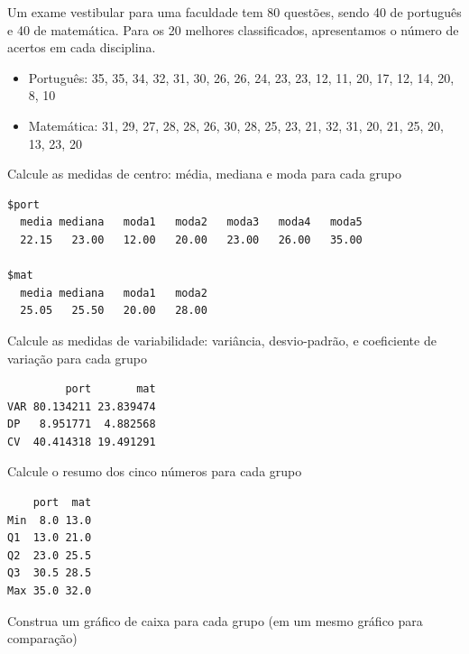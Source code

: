 \documentclass[a4paper,11pt,fleqn]{article}\usepackage[]{graphicx}\usepackage[]{color}
\makeatletter
\newenvironment{kframe}{%
 \def\at@end@of@kframe{}%
 \ifinner\ifhmode%
  \def\at@end@of@kframe{\end{minipage}}%
  \begin{minipage}{\columnwidth}%
 \fi\fi%
 \def\FrameCommand##1{\hskip\@totalleftmargin \hskip-\fboxsep
 \colorbox{shadecolor}{##1}\hskip-\fboxsep
     \hskip-\linewidth \hskip-\@totalleftmargin \hskip\columnwidth}%
 \MakeFramed {\advance\hsize-\width
   \@totalleftmargin\z@ \linewidth\hsize
   \@setminipage}}%
 {\par\unskip\endMakeFramed%
 \at@end@of@kframe}
\newenvironment{knitrout}{}{} %
\theoremstyle{definition}
\makeatother
\begin{document}
\begin{compactenum}[5.] %
\item Um exame vestibular para uma faculdade tem 80 questões, sendo 40
  de português e 40 de matemática. Para os 20 melhores classificados,
  apresentamos o número de acertos em cada disciplina.
  \begin{itemize}
  \item Português: 35, 35, 34, 32, 31, 30, 26, 26, 24, 23, 23, 12, 11,
    20, 17, 12, 14, 20, 8, 10
  \item Matemática: 31, 29, 27, 28, 28, 26, 30, 28, 25, 23, 21, 32, 31,
    20, 21, 25, 20, 13, 23, 20
  \end{itemize}

\begin{compactenum}
\item Calcule as medidas de centro: média, mediana e moda para cada grupo
\begin{knitrout}\small
{}\color{fgcolor}\begin{kframe}
\begin{verbatim}
$port
  media mediana   moda1   moda2   moda3   moda4   moda5 
  22.15   23.00   12.00   20.00   23.00   26.00   35.00 

$mat
  media mediana   moda1   moda2 
  25.05   25.50   20.00   28.00 
\end{verbatim}
\end{kframe}
\end{knitrout}
  \item Calcule as medidas de variabilidade: variância, desvio-padrão, e
    coeficiente de variação para cada grupo
\begin{knitrout}\small
{}\color{fgcolor}\begin{kframe}
\begin{verbatim}
         port       mat
VAR 80.134211 23.839474
DP   8.951771  4.882568
CV  40.414318 19.491291
\end{verbatim}
\end{kframe}
\end{knitrout}
  \item Calcule o resumo dos cinco números para cada grupo
\begin{knitrout}\small
{}\color{fgcolor}\begin{kframe}
\begin{verbatim}
    port  mat
Min  8.0 13.0
Q1  13.0 21.0
Q2  23.0 25.5
Q3  30.5 28.5
Max 35.0 32.0
\end{verbatim}
\end{kframe}
\end{knitrout}
  \item Construa um gráfico de caixa para cada grupo (em um mesmo
    gráfico para comparação)
\begin{knitrout}\small
{}\color{fgcolor}


\end{knitrout}
\end{compactenum}
\end{compactenum}
\end{document}
